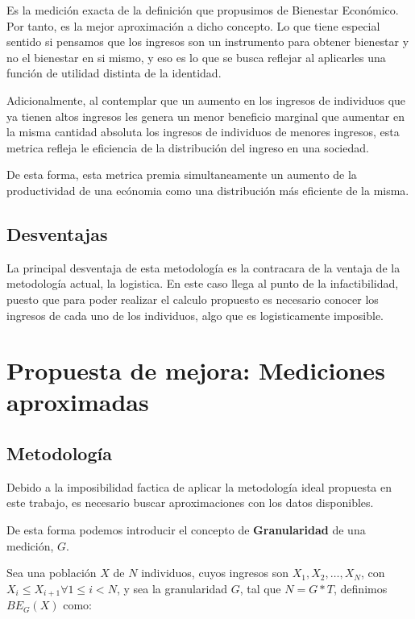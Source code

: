 Es la medición exacta de la definición que propusimos de Bienestar Económico. Por tanto, es la mejor aproximación a dicho concepto. Lo que tiene especial sentido si pensamos que los ingresos son un instrumento para obtener bienestar y no el bienestar en si mismo, y eso es lo que se busca reflejar al aplicarles una función de utilidad distinta de la identidad.


Adicionalmente, al contemplar que un aumento en los ingresos de individuos que ya tienen altos ingresos les genera un menor beneficio marginal que aumentar en la misma cantidad absoluta los ingresos de individuos de menores ingresos, esta metrica refleja le eficiencia de la distribución del ingreso en una sociedad.

De esta forma, esta metrica premia simultaneamente un aumento de la productividad de una ecónomia como una distribución más eficiente de la misma.



\subsection{Desventajas}

La principal desventaja de esta metodología es la contracara de la ventaja de la metodología actual, la logistica. En este caso llega al punto de la infactibilidad, puesto que para poder realizar el calculo propuesto es necesario conocer los ingresos de cada uno de los individuos, algo que es logisticamente imposible.

\section{Propuesta de mejora: Mediciones aproximadas}

\subsection{Metodología}

Debido a la imposibilidad factica de aplicar la metodología ideal propuesta en este trabajo, es necesario buscar aproximaciones con los datos disponibles.

De esta forma podemos introducir el concepto de \textbf{Granularidad} de una medición, $G$.

Sea una población $X$ de $N$ individuos, cuyos ingresos son $X_1, X_2, \dots, X_N $, con $X_i \leq X_{i+1} \forall 1 \leq i < N$, y sea la granularidad $G$, tal que $N = G * T$, definimos $BE_G(X)$ como:

